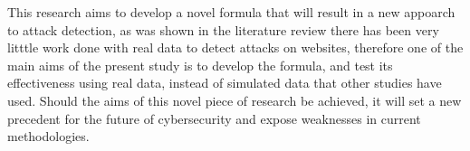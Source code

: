
This research aims to develop a novel formula that will result in a new appoarch to attack detection, as was shown in the literature review there has been very litttle work done with real data to detect attacks on websites, therefore one of the main aims of the present study is to develop the formula, and test its effectiveness using real data, instead of simulated data that other studies have used. Should the aims of this novel piece of research be achieved, it will set a new precedent for the future of cybersecurity and expose weaknesses in current methodologies.